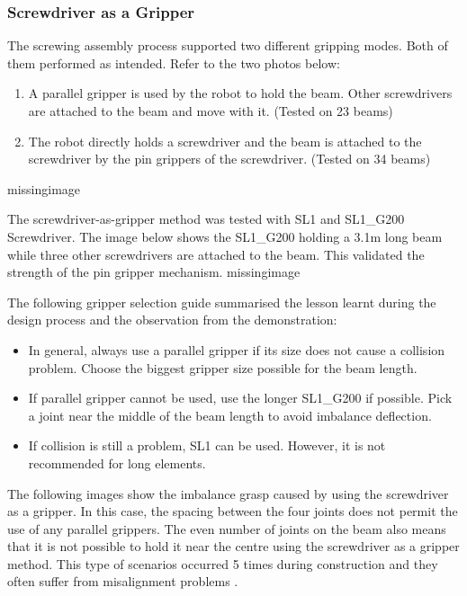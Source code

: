 \subsubsection{Screwdriver as a Gripper}
\label{subsubsection:exploration-4-screwdriver-as-a-gripper}

The screwing assembly process supported two different gripping modes. Both of them performed as intended. Refer to the two photos below:
\begin{enumerate}
    \item A parallel gripper is used by the robot to hold the beam. Other screwdrivers are attached to the beam and move with it. (Tested on 23 beams)
    \item The robot directly holds a screwdriver and the beam is attached to the screwdriver by the pin grippers of the screwdriver.  (Tested on 34 beams)
\end{enumerate}
missingimage

The screwdriver-as-gripper method was tested with SL1 and SL1\_G200 Screwdriver. The image below shows the SL1\_G200 holding a 3.1m long beam while three other screwdrivers are attached to the beam. This validated the strength of the pin gripper mechanism.
missingimage

The following gripper selection guide summarised the lesson learnt during the design process and the observation from the demonstration:
\begin{itemize}
    \item In general, always use a parallel gripper if its size does not cause a collision problem. Choose the biggest gripper size possible for the beam length.
    \item If parallel gripper cannot be used, use the longer SL1\_G200 if possible. Pick a joint near the middle of the beam length to avoid imbalance deflection.
    \item If collision is still a problem, SL1 can be used. However, it is not recommended for long elements.
\end{itemize}
The following images show the imbalance grasp caused by using the screwdriver as a gripper. In this case, the spacing between the four joints does not permit the use of any parallel grippers. The even number of joints on the beam also means that it is not possible to hold it near the centre using the screwdriver as a gripper method. This type of scenarios occurred 5 times during construction and they often suffer from misalignment problems .

